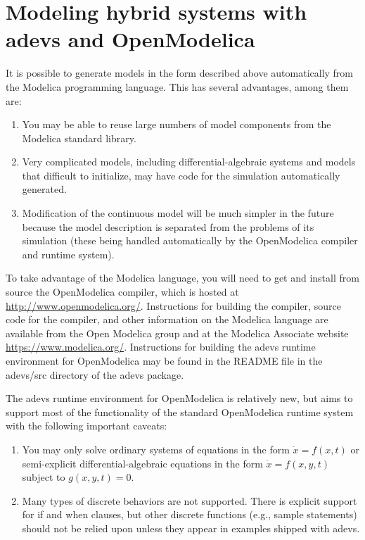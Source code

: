 \section{Modeling hybrid systems with adevs and OpenModelica}
It is possible to generate models in the form described above automatically from the Modelica programming language. This has several advantages, among them are:
\begin{enumerate}
\item You may be able to reuse large numbers of model components from the Modelica standard library.
\item Very complicated models, including differential-algebraic systems and models that difficult to initialize, may have code for the simulation automatically generated.
\item Modification of the continuous model will be much simpler in the future because the model description is separated from the problems of its simulation (these being handled automatically by the OpenModelica compiler and runtime system).
\end{enumerate}

To take advantage of the Modelica language, you will need to get and install from source the OpenModelica compiler, which is hosted at \url{http://www.openmodelica.org/}. Instructions for building the compiler, source code for the compiler, and other information on the Modelica language are available from the Open Modelica group and at the Modelica Associate website \url{https://www.modelica.org/}. Instructions for building the adevs runtime environment for OpenModelica may be found in the README file in the adevs/src directory of the adevs package.

The adevs runtime environment for OpenModelica is relatively new, but aims to support most of the functionality of the standard OpenModelica runtime system with the following important caveats:
\begin{enumerate}
\item You may only solve ordinary systems of equations in the form $\dot{x}=f(x,t)$ or semi-explicit differential-algebraic equations in the form $\dot{x}=f(x,y,t)$ subject to $g(x,y,t)=0$.
\item Many types of discrete behaviors are not supported. There is explicit support for if and when clauses, but other discrete functions (e.g., sample statements) should not be relied upon unless they appear in examples shipped with adevs.
\end{enumerate}

